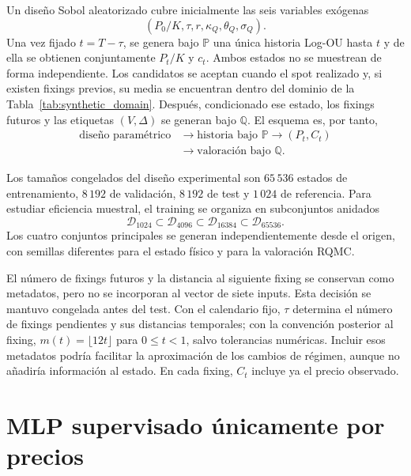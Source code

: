 Un diseño Sobol aleatorizado cubre inicialmente las seis variables exógenas
\[
    (P_0/K,\tau,r,\kappa_Q,\theta_Q,\sigma_Q).
\]
Una vez fijado
$t=T-\tau$, se genera bajo $\mathbb P$ una única historia Log-OU hasta $t$ y de
ella se obtienen conjuntamente $P_t/K$ y $c_t$. Ambos estados no se muestrean de
forma independiente. Los candidatos se aceptan cuando el spot realizado y, si
existen fixings previos, su media se encuentran dentro del dominio de la
Tabla~\ref{tab:synthetic_domain}. Después, condicionado ese estado, los fixings
futuros y las etiquetas $(V,\Delta)$ se generan bajo $\mathbb Q$. El esquema es,
por tanto,
\begin{equation}
    \begin{aligned}
        \text{diseño paramétrico}
        &\rightarrow \text{historia bajo }\mathbb P
        \rightarrow (P_t,C_t) \\
        &\rightarrow \text{valoración bajo }\mathbb Q .
    \end{aligned}
    \label{eq:dataset_measure_pipeline}
\end{equation}

Los tamaños congelados del diseño experimental son $65\,536$ estados de entrenamiento,
$8\,192$ de validación, $8\,192$ de test y $1\,024$ de referencia. Para estudiar
eficiencia muestral, el training se organiza en subconjuntos anidados
\begin{equation}
    \mathcal D_{1024}\subset\mathcal D_{4096}\subset
    \mathcal D_{16384}\subset\mathcal D_{65536}.
    \label{eq:nested_training_sets}
\end{equation}
Los cuatro conjuntos principales se generan independientemente desde el origen,
con semillas diferentes para el estado físico y para la valoración RQMC.

El número de fixings futuros y la distancia al siguiente fixing se conservan
como metadatos, pero no se incorporan al vector de siete inputs. Esta decisión se
mantuvo congelada antes del test. Con el calendario fijo, $\tau$ determina el número de fixings pendientes y sus
distancias temporales; con la convención posterior al fixing,
$m(t)=\lfloor12t\rfloor$ para $0\leq t<1$, salvo tolerancias numéricas.
Incluir esos metadatos podría facilitar la aproximación de los cambios de régimen,
aunque no añadiría información al estado. En cada fixing, $C_t$ incluye ya el precio observado.


\section{MLP supervisado únicamente por precios}
\label{sec:mlp}

